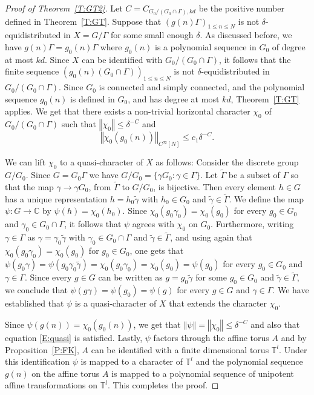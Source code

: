 \documentclass[11pt]{amsart}
\newcommand{\C}{\mathbb{C}}
\newcommand{\T}{\mathbb{T}}
\newcommand{\norm}[1]{\left\Vert #1\right\Vert}
\theoremstyle{plain}
\theoremstyle{definition}
\theoremstyle{remark}
\begin{document}
\begin{proof}[Proof of Theorem~\ref{T:GT2}]
  Let $C=C_{G_0/(G_0\cap \Gamma),kd}$ be the positive number defined in
  Theorem~\ref{T:GT}.  Suppose that $(g(n)\Gamma)_{1\leq n\leq N}$ is
  not $\delta$-equidistributed in $X=G/\Gamma$ for some small enough
  $\delta$.  As discussed before, we have
  $g(n)\Gamma=g_0(n)\Gamma$ where $g_0(n)$ is a polynomial sequence in
  $G_0$ of degree at most $kd$.  Since $X$ can be identified with
  $G_0/(G_0\cap \Gamma)$, it follows that the finite sequence
  $(g_0(n)(G_0\cap \Gamma))_{1\leq n\leq N}$ is not $\delta$-equidistributed
  in $G_0/(G_0\cap \Gamma)$.  Since $G_0$ is connected and simply connected,
  and the polynomial
  sequence $g_0(n)$ is defined in $G_0$, and has degree at most $kd$,
  Theorem~\ref{T:GT} applies. We get that there exists a non-trivial horizontal
  character $\chi_0$ of $G_0/(G_0\cap \Gamma)$ such that $\norm{\chi_0}\leq
  \delta^{-C}$ and
$$
\norm{\chi_0( g_0(n))}_{C^\infty[N]}\leq c_1 \delta^{-C}.
$$

We can lift $\chi_0$ to a quasi-character of $X$ as follows:
Consider the  discrete group $G/G_0$. Since $G=G_0\Gamma$  we have $G/G_0=\{\gamma G_0\colon \gamma\in \Gamma\}$.
Let  $\tilde{\Gamma}$  be a subset of $\Gamma$ so that the map $\gamma\to \gamma G_0$, from $\tilde{\Gamma}$ to $G/G_0$,
is bijective.
 Then every element $h\in G$ has a unique representation $h=h_0\tilde{\gamma}$
 with $h_0\in G_0$ and $\tilde{\gamma}\in \tilde{\Gamma}$.
We define the map $\psi\colon G\to \C$ by  $\psi(h)=\chi_0(h_0)$.
Since $\chi_0(g_0\gamma_0)=\chi_0(g_0)$ for every  $g_0\in G_0$ and $\gamma_0\in G_0\cap \Gamma$, it
 follows that
$\psi$  agrees with $\chi_0$ on  $G_0$.
Furthermore, writing $\gamma\in \Gamma$ as $\gamma=\gamma_0\tilde{\gamma}$ with $\gamma_0\in G_0\cap \Gamma$ and
$\tilde{\gamma}\in \tilde{\Gamma}$, and using again that $\chi_0(g_0\gamma_0)=\chi_0(g_0)$ for $g_0\in G_0$, one gets
that $\psi(g_0\gamma)=\psi(g_0\gamma_0\tilde{\gamma})=\chi_0(g_0\gamma_0)=\chi_0(g_0)=\psi(g_0)$ for every $g_0\in G_0$ and $\gamma\in \Gamma$.  Since every $g\in G$ can be written as
 $g=g_0\tilde{\gamma}$ for some  $g_0\in G_0$ and $\tilde{\gamma}\in \tilde{\Gamma}$, we conclude that
 $\psi(g\gamma)=\psi(g_0)=\psi(g)$ for every $g\in G$ and $\gamma\in \Gamma$.
We have established that  $\psi$ is a
quasi-character of $X$ that extends the character $\chi_0$.

Since $\psi(g(n))=\chi_0( g_0(n))$, we get
that $\norm{\psi}=\norm{\chi_0}\leq \delta^{-C}$ and also that
equation \eqref{E:quasi} is satisfied. Lastly, $\psi$ factors through
the affine torus $A$ and by Proposition~\ref{P:FK}, $A$ can be
identified with a finite dimensional torus $\T^l$. Under this
identification $\psi$ is mapped to a character of $\T^l$ and the
polynomial sequence $g(n)$ on the affine torus $A$ is mapped to a
polynomial sequence of unipotent affine transformations on $\T^l$.
This completes the proof.
\end{proof}
\end{document}
